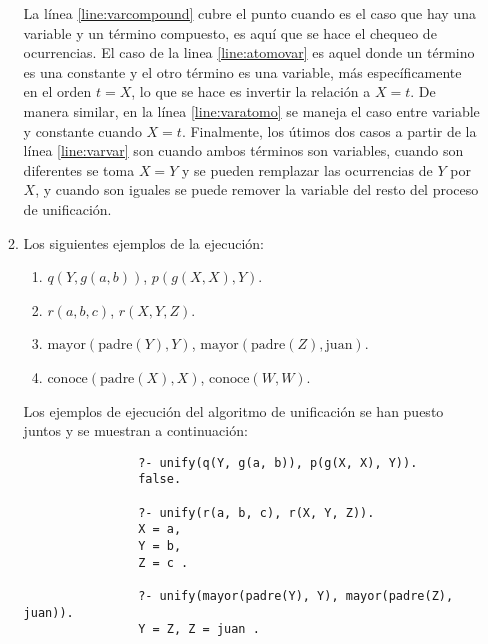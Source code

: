 \begin{enumerate}
\begin{enumerate}
\begin{solution}
            La línea \ref{line:varcompound} cubre el punto cuando es el caso que hay una variable y un término compuesto, es aquí que se hace el chequeo de ocurrencias. El caso de la linea \ref{line:atomovar} es aquel donde un término es una constante y el otro término es una variable, más específicamente en el orden $t = X$, lo que se hace es invertir la relación a $X = t$. De manera similar, en la línea \ref{line:varatomo} se maneja el caso entre variable y constante cuando $X = t$. Finalmente, los útimos dos casos a partir de la línea \ref{line:varvar} son cuando ambos términos son variables, cuando son diferentes se toma $X = Y$ y se pueden remplazar las ocurrencias de $Y$ por $X$, y cuando son iguales se puede remover la variable del resto del proceso de unificación. 
        \end{solution}
        \item Los siguientes ejemplos de la ejecución:
        \begin{enumerate}
            \item $q(Y, g(a, b))$, $p(g(X, X), Y)$.
            \item $r(a, b, c)$, $r(X, Y, Z)$.
            \item $\text{mayor}(\text{padre}(Y), Y)$, $\text{mayor}(\text{padre}(Z), \text{juan})$.
            \item $\text{conoce}(\text{padre}(X), X)$, $\text{conoce}(W, W)$.
        \end{enumerate}
        \begin{solution}
            Los ejemplos de ejecución del algoritmo de unificación se han puesto juntos y se muestran a continuación:
            \begin{verbatim}
                ?- unify(q(Y, g(a, b)), p(g(X, X), Y)).
                false.

                ?- unify(r(a, b, c), r(X, Y, Z)).
                X = a,
                Y = b,
                Z = c .

                ?- unify(mayor(padre(Y), Y), mayor(padre(Z), juan)).
                Y = Z, Z = juan .


\end{verbatim}
\end{solution}
\end{enumerate}
\end{enumerate}
